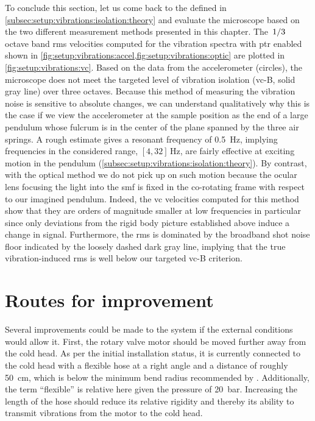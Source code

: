 To conclude this section, let us come back to the  defined in \cref{subsec:setup:vibrations:isolation:theory} and evaluate the microscope based on the two different measurement methods presented in this chapter.
The $\flatfrac{1}{3}$ octave band \gls{rms} velocities computed for the vibration spectra with \gls{ptr} enabled shown in \cref{fig:setup:vibrations:accel,fig:setup:vibrations:optic} are plotted in \cref{fig:setup:vibrations:vc}.
Based on the data from the accelerometer (circles), the microscope does not meet the targeted level of vibration isolation (\acrshort{vc}-B, solid gray line) over three octaves.
Because this method of measuring the vibration noise is sensitive to absolute changes, we can understand qualitatively why this is the case if we view the accelerometer at the sample position as the end of a large pendulum whose fulcrum is in the center of the plane spanned by the three air springs.
A rough estimate gives a resonant frequency of \qty{0.5}{\hertz},
implying frequencies in the considered range, $[4, 32]\,\unit{\hertz}$, are fairly effective at exciting motion in the pendulum (\cf \cref{subsec:setup:vibrations:isolation:theory}).
By contrast, with the optical method we do not pick up on such motion because the ocular lens focusing the light into the \gls{smf} is fixed in the co-rotating frame with respect to our imagined pendulum.
Indeed, the \gls{vc} velocities computed for this method show that they are orders of magnitude smaller at low frequencies in particular since only deviations from the rigid body picture established above induce a change in signal.
Furthermore, the \gls{rms} is dominated by the broadband shot noise floor indicated by the loosely dashed dark gray line, implying that the true vibration-induced \gls{rms} is well below our targeted \acrshort{vc}-B criterion.

\section{Routes for improvement}\label{sec:setup:vibrations:outlook}
Several improvements could be made to the system if the external conditions would allow it.
First, the rotary valve motor should be moved further away from the cold head.
As per the initial installation status, it is currently connected to the cold head with a flexible hose at a right angle and a distance of roughly \qty{50}{\cm}, which is below the minimum bend radius recommended by \oxinst.
Additionally, the term \enquote{flexible} is relative here given the pressure of \qty{20}{\bar}.
Increasing the length of the hose should reduce its relative rigidity and thereby its ability to transmit vibrations from the motor to the cold head.

